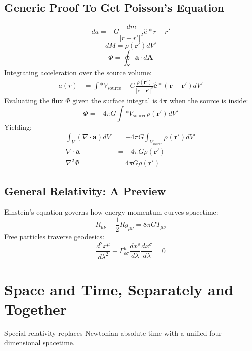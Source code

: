 \documentclass[11pt, a4paper]{report}
\begin{document}
\subsection*{Generic Proof To Get Poisson's Equation}
\begin{equation}\label{eq:acc-dm}
da = - G \frac{dm}{|r - r'|^2} \hat{e}*{r-r'}
\end{equation}
\begin{equation}\label{eq:dm_rho}
dM = \rho(\mathbf{r}') dV'
\end{equation}
\begin{equation}\label{eq:flux}
\Phi = \oint_S \mathbf{a} \cdot d\mathbf{A}
\end{equation}
Integrating acceleration over the source volume:
\begin{align*}
a(r) &= \int*{V_{\text{source}}} -G \frac{\rho(\mathbf{r}')}{|\mathbf{r}-\mathbf{r}'|^2} \hat{\mathbf{e}}*{(\mathbf{r}-\mathbf{r}')} dV'
\end{align*}
Evaluating the flux $\Phi$ given the surface integral is $4\pi$ when the source is inside:
\begin{equation}\label{flux_mass}
\Phi = -4 \pi G \int*{V_{\text{source}}}\rho(\mathbf{r}') dV'
\end{equation}
Yielding:
\begin{align*}
\int_V (\nabla \cdot \mathbf{a}) dV &= -4 \pi G \int_{V_{\text{source}}}\rho(\mathbf{r}') dV' \\
\nabla \cdot \mathbf{a} &= -4 \pi G \rho(\mathbf{r'}) \\
\nabla^2 \Phi &= 4 \pi G \rho(\mathbf{r'})
\end{align*}

\subsection*{General Relativity: A Preview}
Einstein's equation governs how energy-momentum curves spacetime:
\begin{equation}\label{eq:einstein}
R_{\mu\nu} - \frac{1}{2} R g_{\mu\nu} = 8\pi G T_{\mu\nu}
\end{equation}
Free particles traverse geodesics:
\begin{equation}\label{eq:geodesic}
\frac{d^2 x^{\mu}}{d\lambda^2} + \Gamma^{\mu}_{\rho\sigma} \frac{dx^{\rho}}{d\lambda} \frac{dx^{\sigma}}{d\lambda} = 0
\end{equation}

\section{Space and Time, Separately and Together}
Special relativity replaces Newtonian absolute time with a unified four-dimensional spacetime.
\end{document}
